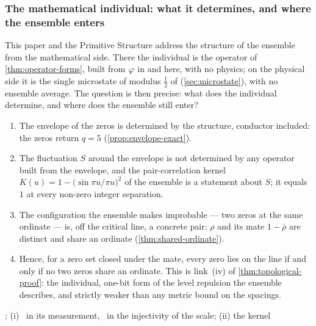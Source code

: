 \subsubsection{The mathematical individual: what it determines, and where the ensemble enters}\label{ssec:individual-ensemble}

This paper and the Primitive Structure address the structure of the ensemble from the
mathematical side.  There the individual is the operator of \cref{thm:operator-forms}, built
from $\varphi$ in \cite{gonzalez25hp} and here, with no physics; on the physical side it
is the single microstate of modulus $\tfrac12$ of \cite{gonzalez26cw}
(\cref{sec:microstate}), with no ensemble average.  The question is then precise: what
does the individual determine, and where does the ensemble still enter?

\begin{proposition}\label{prop:individual-ensemble}
\begin{enumerate}[label=\textup{(\roman*)}]
  \item The envelope of the zeros is determined by the structure, conductor included:
    the zeros return $q=5$ (\cref{prop:envelope-exact}).
  \item The fluctuation $S$ around the envelope is not determined by any operator built
    from the envelope, and the pair-correlation kernel
    $K(u)=1-\bigl(\sin\pi u/\pi u\bigr)^2$ of the ensemble is a statement about $S$; it
    equals $1$ at every non-zero integer separation.
  \item The configuration the ensemble makes improbable --- two zeros at the same
    ordinate --- is, off the critical line, a concrete pair: $\rho$ and its mate
    $1-\bar\rho$ are distinct and share an ordinate (\cref{thm:shared-ordinate}).
  \item Hence, for a zero set closed under the mate, every zero lies on the line if and
    only if no two zeros share an ordinate.  This is link~(iv) of
    \cref{thm:topological-proof}: the individual, one-bit form of the level repulsion
    the ensemble describes, and strictly weaker than any metric bound on the spacings.
\end{enumerate}
\leavevmode{}; (i) \ in its measurement,
\ in the injectivity of the scale; (ii) the kernel
\end{proposition}

